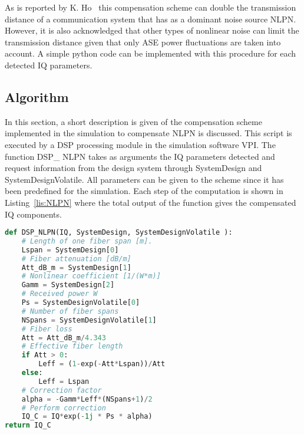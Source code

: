 \begin{figure}[H]
                                                                                                                                                                                                                                                                                                                                                                                                                                                                                                                                                                   
  \label{fig:NLPNvis}
\end{figure}

As is reported by K. Ho~\cite{NLPNDSP} this compensation scheme can double the transmission distance of a communication system that has as a dominant noise source NLPN. However, it is also acknowledged that other types of nonlinear noise can limit the transmission distance given that only ASE power fluctuations are taken into account. A simple python code can be implemented with this procedure for each detected IQ parameters.

\subsection{Algorithm}

In this section, a short description is given of the compensation scheme implemented in the simulation to compensate NLPN is discussed. This script is executed by a DSP processing module in the simulation software VPI. The function DSP\_ NLPN takes as arguments the IQ parameters detected and request information from the design system through SystemDesign and SystemDesignVolatile. All parameters can be given to the scheme since it has been predefined for the simulation. Each step of the computation is shown in Listing~\ref{lis:NLPN} where the total output of the function gives the compensated IQ components. ~\\
 
\begin{lstlisting}[language=Python, caption= 	Python implementation of a analytically derived compensation scheme to mitigate NLPN. The scheme requires the current state of the system given by user input. ,label=lis:NLPN]
def DSP_NLPN(IQ, SystemDesign, SystemDesignVolatile ):
	# Length of one fiber span [m].
	Lspan = SystemDesign[0]
	# Fiber attenuation [dB/m]
	Att_dB_m = SystemDesign[1]
	# Nonlinear coefficient [1/(W*m)]
	Gamm = SystemDesign[2]
	# Received power W
	Ps = SystemDesignVolatile[0]
	# Number of fiber spans
	NSpans = SystemDesignVolatile[1]
	# Fiber loss
	Att = Att_dB_m/4.343
	# Effective fiber length
	if Att > 0:
		Leff = (1-exp(-Att*Lspan))/Att
	else:
		Leff = Lspan
	# Correction factor
	alpha = -Gamm*Leff*(NSpans+1)/2
	# Perform correction
	IQ_C = IQ*exp(-1j * Ps * alpha)
return IQ_C
\end{lstlisting}

